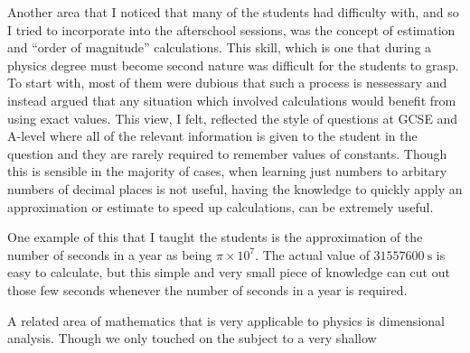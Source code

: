     Another area that I noticed that many of the students had difficulty with, and so I tried to incorporate into the afterschool sessions, was the concept of estimation and ``order of magnitude'' calculations. This skill, which is one that during a physics degree must become second nature was difficult for the students to grasp. To start with, most of them were dubious that such a process is nessessary and instead argued that any situation which involved calculations would benefit
    from using exact values. This view, I felt, reflected the style of questions at GCSE and A-level where all of the relevant information is given to the student in the question and they are rarely required to remember values of constants. Though this is sensible in the majority of cases, when learning just numbers to arbitary numbers of decimal places is not useful, having the knowledge to quickly apply an approximation or estimate to speed up calculations, can be extremely useful.

    One example of this that I taught the students is the approximation of the number of seconds in a year as being $\pi \times 10^{7}$. The actual value of $\SI{31557600}{\second}$ is easy to calculate, but this simple and very small piece of knowledge can cut out those few seconds whenever the number of seconds in a year is required.

    A related area of mathematics that is very applicable to physics is dimensional analysis. Though we only touched on the subject to a very shallow 
